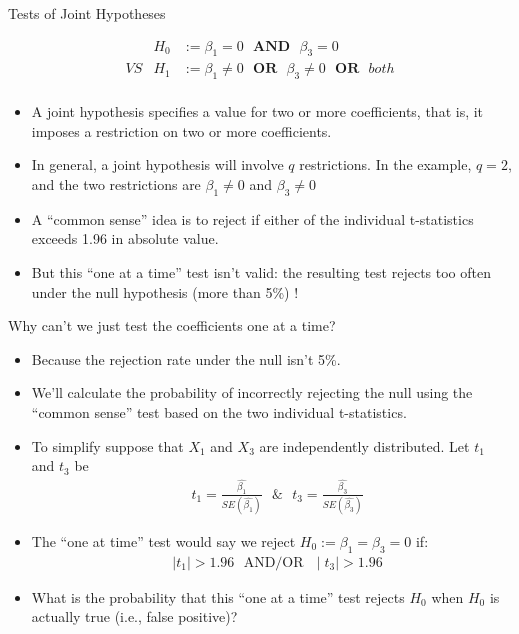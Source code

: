 \documentclass[notes,10pt, aspectratio=169]{beamer}
\begin{document}
\begin{frame}{Tests of Joint Hypotheses }

\begin{eqnarray*}
    & H_0 &:= \beta_1=0 \textbf{~~AND~~} \beta_3=0\\
    VS & H_1 &:= \beta_1\neq0 \textbf{~~OR~~} \beta_3\neq0 \textbf{~~OR~~} both \\
\end{eqnarray*}

\begin{itemize}
    \item A joint hypothesis specifies a value for two or more coefficients, that is, it imposes a restriction on two or more coefficients.
    \item In general, a joint hypothesis will involve $q$ restrictions. In the example, $q=2$, and the two restrictions are $\beta_1\neq0$ and $\beta_3\neq0$
    \item A ``common sense'' idea is to reject if either of the individual t-statistics exceeds 1.96 in absolute value.
    \item But this ``one at a time'' test isn’t valid: the resulting test rejects too often under the null hypothesis (more than 5\%) !
\end{itemize}

\end{frame}

\begin{frame}{Why can’t we just test the coefficients one at a time?}
\begin{itemize}
    \item Because the rejection rate under the null isn’t 5\%.
    \item We’ll calculate the probability of incorrectly rejecting the null using the ``common sense'' test based on the two individual t-statistics.
    \item To simplify suppose that $X_1$ and $X_3$ are independently distributed. Let $t_1$ and $t_3$ be 
    \begin{eqnarray*}
    & t_1 = \frac{\hat{\beta_1}}{SE(\hat{\beta_1})} \text{~~\&~~} t_3 = \frac{\hat{\beta_3}}{SE(\hat{\beta_3})}
    \end{eqnarray*}
    \item The ``one at time'' test would say we reject $H_0:= \beta_1=\beta_3=0$ if:
        \begin{eqnarray*}
    & \mid t_1 \mid > 1.96 \text{~~AND/OR~~}\mid t_3 \mid > 1.96
    \end{eqnarray*}
    \item What is the probability that this ``one at a time'' test rejects $H_0$ when $H_0$ is actually true (i.e., false positive)?    
\end{itemize}
\end{frame}
\end{document}
